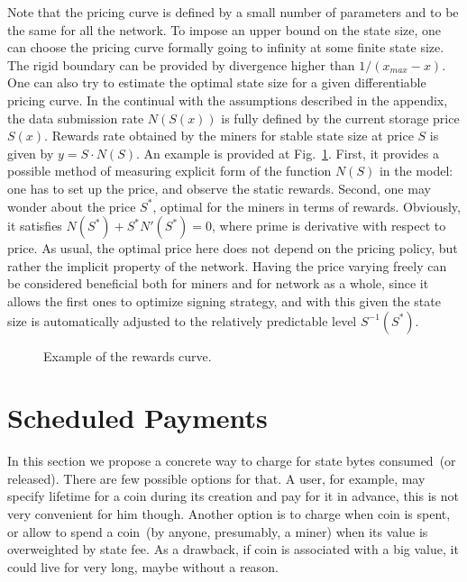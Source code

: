 \documentclass[]{llncs}   %
\newcommand{\authnote}[2]{\marginpar{\parbox{\marginparwidth}{\tiny %
  \textsf{#1 {\textcolor{blue}{notes: #2}}}}}%
  \textcolor{blue}{\textbf{\dag}}}
\newcommand{\authnote}[2]{
  \textsf{#1\textcolor{blue}{ #2}}}
\newcommand{\authnote}[2]{}
\newcommand{\knote}[1]{{\authnote{\textcolor{green}{Alex notes:}}{#1}}}
\begin{document}
Note that the pricing curve is defined by a small number of parameters and
to be the same for all the network. To impose an upper bound on the state
size, one can choose the pricing curve formally going to infinity at some finite
state size. The rigid boundary can be provided by divergence higher than
$1/(x_{max}-x)$. One can also try to estimate the optimal state size for a given
differentiable pricing curve. In the continual with the assumptions
described in the appendix, the data submission rate $N(S(x))$ is fully defined by the
current storage price $S(x)$.  Rewards rate obtained by the miners for stable
state size at price $S$ is given by $y = S \cdot N(S)$. An example is provided at
Fig.~\ref{fig:rewards}. First, it provides a possible method of measuring
explicit form of the function $N(S)$ in the model: one has to set up the price,
and observe the static rewards. Second, one may wonder about the price $S^*$,
optimal for the miners in terms of rewards. Obviously, it satisfies
$N(S^*)+S^*N'(S^*)=0$, where prime is derivative with respect to price. As
usual, the optimal price here does not depend on the pricing policy, but rather
the implicit property of the network. \knote{what does the last sentence mean?}  Having the price varying freely can be
considered beneficial both for miners and for network as a whole, since it
allows the first ones to optimize signing strategy, and with this given the
state size is automatically adjusted to the relatively predictable level
$S^{-1}(S^*)$.

\begin{figure}
    
    \caption{
        \label{fig:rewards} Example of the rewards curve.
    }
\end{figure}

\section{Scheduled Payments}
\label{sec:scheduled}

In this section we propose a concrete way to charge for state bytes consumed~(or released). There are few possible options for that. A user, for example, may specify lifetime for a coin during its creation and pay for it in advance, this is not very convenient for him though. Another option is to charge when coin is spent, or allow to spend a coin~(by anyone, presumably, a miner) when its value is overweighted by state fee. As a drawback, if coin is associated with a big value, it could live for very long, maybe without a reason. 
\end{document}

